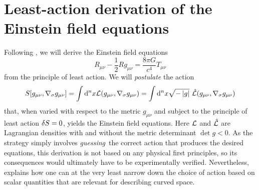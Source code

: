 \section{Least-action derivation of the Einstein field equations}
\label{sec:einstein_derivation}

Following \cite[section 4.3]{ref:carroll}, we will derive the Einstein field equations
\begin{equation}
	R_{\mu \nu} - \frac{1}{2} R g_{\mu \nu} = \frac{8 \pi G}{c^4} T_{\mu \nu}
\end{equation}
from the principle of least action.
We will \emph{postulate} the action
\begin{equation}
	S[g_{\mu \nu}, \nabla_\sigma g_{\mu \nu}] = \int \dif^n x \lagr(g_{\mu \nu}, \nabla_\sigma g_{\mu \nu})
	                                          = \int \dif^n x \sqrt{-\det{g}} \hat{\lagr}(g_{\mu \nu}, \nabla_\sigma g_{\mu \nu})
\end{equation}
that, when varied with respect to the metric $g_{\mu \nu}$ and subject to the principle of least action $\delta S = 0$, yields the Einstein field equations.
Here $\mathcal{L}$ and $\hat{\mathcal{L}}$ are Lagrangian densities with and without the metric determinant $\det{g} < 0$.
As the strategy simply involves \emph{guessing} the correct action that produces the desired equations, this derivation is not based on any physical first principles, so its consequences would ultimately have to be experimentally verified.
Nevertheless, \cite[page 160-161]{ref:carroll} explains how one can at the very least narrow down the choice of action based on scalar quantities that are relevant for describing curved space.

